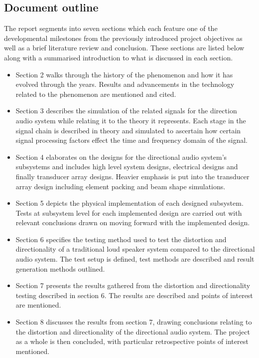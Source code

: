 \subsection{Document outline}
The report segments into seven sections which each feature one of the developmental milestones from the previously introduced project objectives as well as a brief literature review and conclusion. These sections are listed below along with a summarised introduction to what is discussed in each section.
\begin{itemize}
    \item Section 2 walks through the history of the phenomenon and how it has evolved through the years. Results and advancements in the technology related to the phenomenon are mentioned and cited.
    \item Section 3 describes the simulation of the related signals for the direction audio system while relating it to the theory it represents. Each stage in the signal chain is described in theory and simulated to ascertain how certain signal processing factors effect the time and frequency domain of the signal.  
    \item Section 4 elaborates on the designs for the directional audio system's subsystems and includes high level system designs, electrical designs and finally transducer array designs. Heavier emphasis is put into the transducer array design including element packing and beam shape simulations.
    \item Section 5 depicts the physical implementation of each designed subsystem. Tests at subsystem level for each implemented design are carried out with relevant conclusions drawn on moving forward with the implemented design.
    \item Section 6 specifies the testing method used to test the distortion and directionality of a traditional loud speaker system compared to the directional audio system. The test setup is defined, test methods are described and result generation methods outlined.
    \item Section 7 presents the results gathered from the distortion and directionality testing described in section 6. The results are described and points of interest are mentioned.
    \item Section 8 discusses the results from section 7, drawing conclusions relating to the distortion and directionality of the directional audio system. The project as a whole is then concluded, with particular retrospective points of interest mentioned.
\end{itemize}